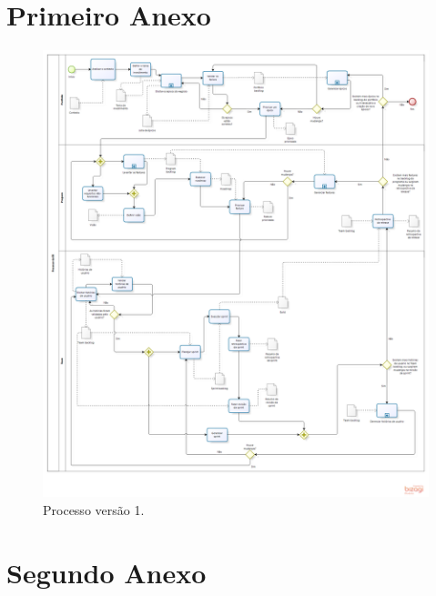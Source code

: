 \begin{anexosenv}
\partanexos

\chapter{Primeiro Anexo}

 \begin{figure}[!htbp]
    \centering
    \includegraphics[scale=0.35]{figuras/Processo_v1}
    \caption[Big picture do processo.]{Processo versão 1. \footnotemark}
    \label{processo}
  \end{figure}

\chapter{Segundo Anexo}


\end{anexosenv}
